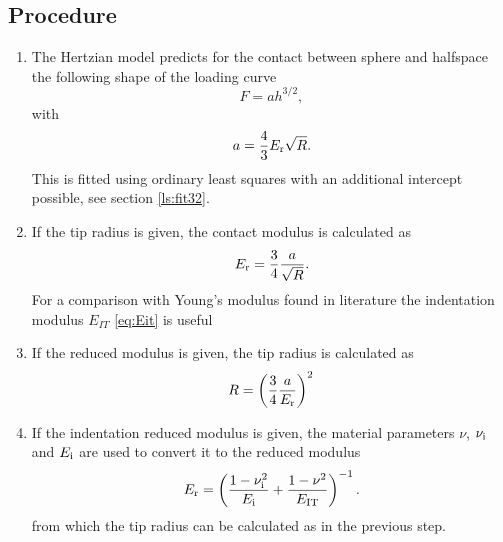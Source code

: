 \subsection{Procedure} \label{hertz_calc}
\begin{enumerate} 
 \item 
The Hertzian model predicts for the contact between sphere and halfspace the following shape of the loading curve
\begin{equation} \label{eq:hertzfit}
F = a h^{3/2},  
\end{equation}
with 
\begin{equation}
a = \frac43 E_\mathrm{r} \sqrt{R}.
\end{equation}
This is fitted using ordinary least squares with an additional intercept possible, see section \ref{ls:fit32}.
\item
If the tip radius is given, the contact modulus is calculated as 
\begin{equation}
E_\mathrm{r} = \frac34 \frac{a}{\sqrt{R}}.
\end{equation}
For a comparison with Young's modulus found in literature the indentation modulus $E_{IT}$ \eqref{eq:Eit} is useful

\item
If the reduced modulus is given, the tip radius is calculated as
\begin{equation}
R =  \left(\frac34 \frac{a}{E_\mathrm{r}}\right)^2
\end{equation}
\item
If the indentation reduced modulus is given, the material parameters $\nu$, $\nu_\mathrm{i}$ and $E_\mathrm{i}$ are used to convert it to the reduced modulus
\begin{equation}
E_\mathrm{r}=\left(\frac{1-\nu_\mathrm{i}^2}{E_\mathrm{i}}+\frac{1-\nu^2}{E_\mathrm{IT}}\right)^{-1}.
\end{equation}
from which the tip radius can be calculated as in the previous step.
\end{enumerate}
